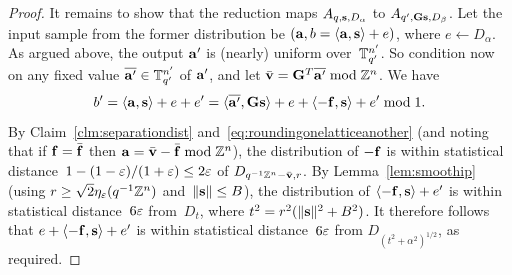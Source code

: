 \begin{proof}
  It remains to show that the reduction maps $A_{q,\mathbf{s},D_{\alpha}}$
  to $A_{q', \mathbf{G} \mathbf{s}, D_{\beta}}$.  Let the input sample from the
  former distribution be $(\mathbf{a},b=\langle\mathbf{a},\mathbf{s}\rangle+e)$, where $e
  \gets D_{\alpha}$.  As argued above, the output $\mathbf{a}'$ is (nearly)
  uniform over~$\mathbb{T}_{q'}^{n'}$.  So condition now on any fixed value $\overline{\mathbf{a}'} \in \mathbb{T}_{q'}^{n'}$ of $\mathbf{a}'$,
	and let $\bar {\mathbf{v}} = \mathbf{G}^{T} \overline{\mathbf{a}'} \bmod \mathbb{Z}^{n}$. 	
	We have
  \[ b' = \langle\mathbf{a},\mathbf{s}\rangle + e + e' = \langle\overline{\mathbf{a}'}, \mathbf{G} \mathbf{s}\rangle +
  e + \langle-\mathbf{f}, \mathbf{s}\rangle + e' \bmod 1. \] 
	By Claim~\ref{clm:separationdist} and~\eqref{eq:roundingonelatticeanother} (and noting that if $\mathbf{f}=\bar {\mathbf{f}}$ then $\mathbf{a} = \bar {\mathbf{v}} - \bar {\mathbf{f}} \bmod \mathbb{Z}^n$),
	the distribution of $-\mathbf{f}$ is within statistical distance~$1-(1-\varepsilon)/(1+\varepsilon) \le 2 \varepsilon$ of
	$D_{q^{-1}\mathbb{Z}^{n}-\bar {\mathbf{v}}, r}$.  By Lemma~\ref{lem:smoothip} (using $r
  \geq \sqrt{2} \eta_{\varepsilon}(q^{-1} \mathbb{Z}^{n})$ and~$\lVert\mathbf{s}\rVert \le B$), the
  distribution of $\langle-\mathbf{f},\mathbf{s}\rangle + e'$ is within statistical 
distance~$6 \varepsilon$ 
  from~$D_{t}$, where $t^{2} = r^{2}(\lVert\mathbf{s}\rVert^{2}+B^{2})$.  It
  therefore follows that $e+\langle-\mathbf{f},\mathbf{s}\rangle + e'$ is within statistical distance~$6 \varepsilon$ 
from $D_{(t^2+\alpha^2)^{1/2}}$, as required.
\end{proof}

